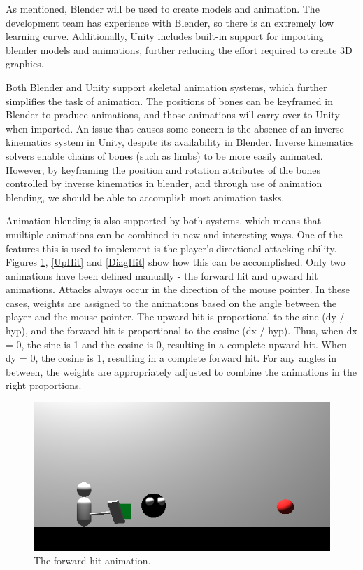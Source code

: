 \documentclass{article}
\begin{document}
As mentioned, Blender will be used to create models and animation.  The development team has experience with Blender, so there is an extremely low learning curve.  Additionally, Unity includes built-in support for importing blender models and animations, further reducing the effort required to create 3D graphics.

Both Blender and Unity support skeletal animation systems, which further simplifies the task of animation.  The positions of bones can be keyframed in Blender to produce animations, and those animations will carry over to Unity when imported.  An issue that causes some concern is the absence of an inverse kinematics system in Unity, despite its availability in Blender.  Inverse kinematics solvers enable chains of bones (such as limbs) to be more easily animated.  However, by keyframing the position and rotation attributes of the bones controlled by inverse kinematics in blender, and through use of animation blending, we should be able to accomplish most animation tasks.

Animation blending is also supported by both systems, which means that muiltiple animations can be combined in new and interesting ways.  One of the features this is used to implement is the player's directional attacking ability.  Figures \ref{ForwardHit}, \ref{UpHit} and \ref{DiagHit} show how this can be accomplished.  Only two animations have been defined manually - the forward hit and upward hit animations.  Attacks always occur in the direction of the mouse pointer.  In these cases, weights are assigned to the animations based on the angle between the player and the mouse pointer.  The upward hit is proportional to the sine (dy / hyp), and the forward hit is proportional to the cosine (dx / hyp).  Thus, when dx = 0, the sine is 1 and the cosine is 0, resulting in a complete upward hit.  When dy = 0, the cosine is 1, resulting in a complete forward hit.  For any angles in between, the weights are appropriately adjusted to combine the animations in the right proportions.

\begin{figure}[h!]

\includegraphics[width=5in]{Graphics/forwardHit.png}
\caption{The forward hit animation.}
\label{ForwardHit}

\end{figure}
\end{document}

